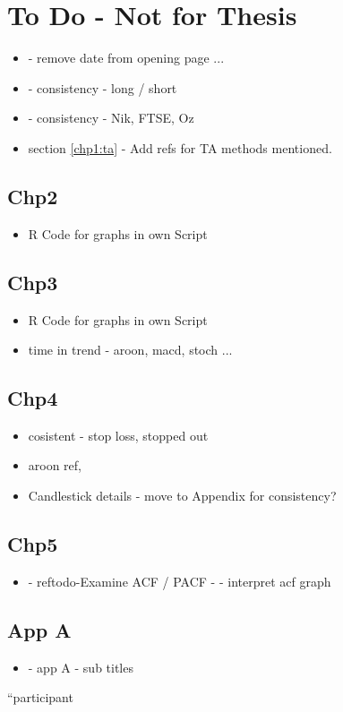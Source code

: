 
\chapter{To Do - Not for Thesis} %

\label{Chapter7} %




\begin{itemize}
\item - remove date from opening page ...
\item - consistency - long / short
\item - consistency - Nik, FTSE, Oz
\item section \ref{chp1:ta} - Add refs for TA methods mentioned.
\end{itemize}

\section{Chp2}
\begin{itemize}
\item R Code for graphs in own Script
\end{itemize}

\section{Chp3}
\begin{itemize}
\item R Code for graphs in own Script
\item time in trend - aroon, macd, stoch ...
\end{itemize}

\section{Chp4}
\begin{itemize}
\item cosistent - stop loss, stopped out
\item aroon ref, 
\item Candlestick details - move to Appendix for consistency?
\end{itemize}

\section{Chp5}
\begin{itemize}
\item - ref{todo-Examine ACF / PACF} - - interpret acf graph
\end{itemize}

\section{App A}
\begin{itemize}
\item - app A - sub titles
\end{itemize}

\textquotedblleft participant
